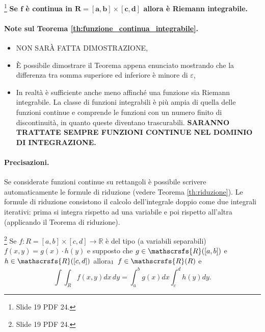 \begin{theorem}\footnote{Slide 19 PDF 24.}\label{th:funzione_continua_integrabile}
	\textbf{Se $\boldsymbol f$ è continua in $\boldsymbol{R = [a, b]\times [c, d]}$ allora è Riemann integrabile.}
\end{theorem}

\paragraph{Note sul Teorema \ref{th:funzione_continua_integrabile}.}
\begin{itemize}
	\item NON SARÀ FATTA DIMOSTRAZIONE,
	\item È possibile dimostrare il Teorema appena enunciato mostrando che la differenza tra somma superiore ed inferiore è minore di $\varepsilon$,
	\item In realtà è sufficiente anche meno affinché una funzione sia Riemann integrabile. La classe di funzioni integrabili è più ampia di quella delle funzioni continue e comprende le funzioni con un numero finito di discontinuità, in quanto queste diventano trascurabili. \textbf{SARANNO TRATTATE SEMPRE FUNZIONI CONTINUE NEL DOMINIO DI INTEGRAZIONE.}
\end{itemize} 

\paragraph{Precisazioni.} Se considerate funzioni continue su rettangoli è possibile scrivere automaticamente le formule di riduzione (vedere Teorema \ref{th:riduzione}). Le formule di riduzione consistono il calcolo dell'integrale doppio come due integrali iterativi: prima si integra rispetto ad una variabile e poi rispetto all'altra (applicando il Teorema di riduzione).

\begin{remark}\footnote{Slide 19 PDF 24.}
	Se $f:R=[a,b]\times[c,d]\rightarrow\mathbb{R}$ è del tipo (a variabili separabili) $f(x,y)=g(x)\cdot h(y)$ e supposto che $g\in\mathscrsfs{R}([a,b])$ e $h\in\mathscrsfs{R}([c,d])$ allora$_{\footnotemark}$ $f\in\mathscrsfs{R}(R)$ e
	\begin{equation*}
		\int\int_R f(x,y) dx\,dy=\int^b_a g(x) dx\int^d_c h(y) dy.
	\end{equation*}
\end{remark}


